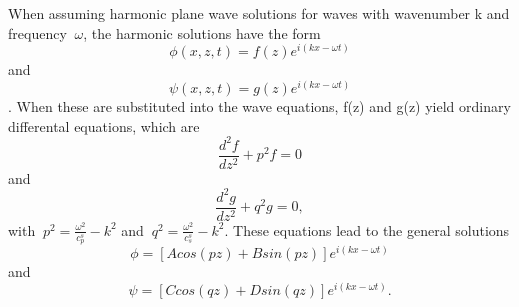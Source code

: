 \documentclass[10pt]{article}
\begin{document}
\begin{itemize}
  When assuming harmonic plane wave solutions for waves with wavenumber k and frequency $\ \omega$, the harmonic solutions have the form \begin{equation}
    \phi(x,z,t) = f(z)e^{i(kx-\omega t)}
  \end{equation} and \begin{equation}
    \psi(x,z,t) = g(z)e^{i(kx-\omega t)}
  \end{equation}. When these are substituted into the wave equations, f(z) and g(z) yield ordinary differental equations, which are \begin{equation}
    \frac{d^2f}{dz^2} + p^2f = 0
  \end{equation} and \begin{equation}
    \frac{d^2g}{dz^2} + q^2g = 0 ,
  \end{equation} with $\ p^2 =  \frac{\omega^2}{c_p^s} -k^2$ and $\ q^2 =  \frac{\omega^2}{c_s^s} -k^2$. These equations lead to the general solutions \begin{equation}
    \phi = [Acos(pz) + Bsin(pz)]e^{i(kx-\omega t)}
  \end{equation} and \begin{equation}
    \psi = [Ccos(qz) + Dsin(qz)]e^{i(kx-\omega t)}.
  \end{equation} \par



\end{itemize}
\end{document}
